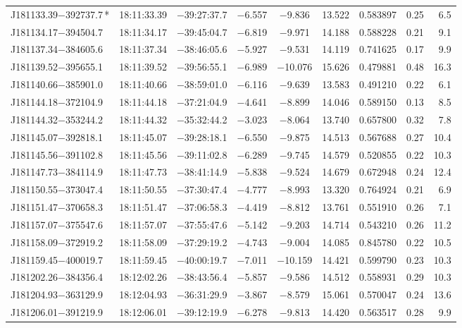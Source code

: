 \begin{table*}
\begin{tabular}{lcccccccr}
J181133.39$-$392737.7\,* & 18:11:33.39 & $-$39:27:37.7 & $-$6.557 & $-$9.836 & 13.522 & 0.583897 & 0.25 & 6.5 \\
J181134.17$-$394504.7 & 18:11:34.17 & $-$39:45:04.7 & $-$6.819 & $-$9.971 & 14.188 & 0.588228 & 0.21 & 9.1 \\
J181137.34$-$384605.6 & 18:11:37.34 & $-$38:46:05.6 & $-$5.927 & $-$9.531 & 14.119 & 0.741625 & 0.17 & 9.9 \\
J181139.52$-$395655.1 & 18:11:39.52 & $-$39:56:55.1 & $-$6.989 & $-$10.076 & 15.626 & 0.479881 & 0.48 & 16.3 \\
J181140.66$-$385901.0 & 18:11:40.66 & $-$38:59:01.0 & $-$6.116 & $-$9.639 & 13.583 & 0.491210 & 0.22 & 6.1 \\
J181144.18$-$372104.9 & 18:11:44.18 & $-$37:21:04.9 & $-$4.641 & $-$8.899 & 14.046 & 0.589150 & 0.13 & 8.5 \\
J181144.32$-$353244.2 & 18:11:44.32 & $-$35:32:44.2 & $-$3.023 & $-$8.064 & 13.740 & 0.657800 & 0.32 & 7.8 \\
J181145.07$-$392818.1 & 18:11:45.07 & $-$39:28:18.1 & $-$6.550 & $-$9.875 & 14.513 & 0.567688 & 0.27 & 10.4 \\
J181145.56$-$391102.8 & 18:11:45.56 & $-$39:11:02.8 & $-$6.289 & $-$9.745 & 14.579 & 0.520855 & 0.22 & 10.3 \\
J181147.73$-$384114.9 & 18:11:47.73 & $-$38:41:14.9 & $-$5.838 & $-$9.524 & 14.679 & 0.672948 & 0.24 & 12.4 \\
J181150.55$-$373047.4 & 18:11:50.55 & $-$37:30:47.4 & $-$4.777 & $-$8.993 & 13.320 & 0.764924 & 0.21 & 6.9 \\
J181151.47$-$370658.3 & 18:11:51.47 & $-$37:06:58.3 & $-$4.419 & $-$8.812 & 13.761 & 0.551910 & 0.26 & 7.1 \\
J181157.07$-$375547.6 & 18:11:57.07 & $-$37:55:47.6 & $-$5.142 & $-$9.203 & 14.714 & 0.543210 & 0.26 & 11.2 \\
J181158.09$-$372919.2 & 18:11:58.09 & $-$37:29:19.2 & $-$4.743 & $-$9.004 & 14.085 & 0.845780 & 0.22 & 10.5 \\
J181159.45$-$400019.7 & 18:11:59.45 & $-$40:00:19.7 & $-$7.011 & $-$10.159 & 14.421 & 0.599790 & 0.23 & 10.3 \\
J181202.26$-$384356.4 & 18:12:02.26 & $-$38:43:56.4 & $-$5.857 & $-$9.586 & 14.512 & 0.558931 & 0.29 & 10.3 \\
J181204.93$-$363129.9 & 18:12:04.93 & $-$36:31:29.9 & $-$3.867 & $-$8.579 & 15.061 & 0.570047 & 0.24 & 13.6 \\
J181206.01$-$391219.9 & 18:12:06.01 & $-$39:12:19.9 & $-$6.278 & $-$9.813 & 14.420 & 0.563517 & 0.28 & 9.9 \\

\end{tabular}
\end{table*}
